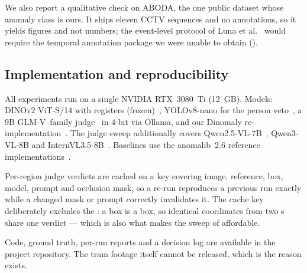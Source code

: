 We also report a qualitative check on ABODA, the one public dataset whose
anomaly class is ours. It ships eleven CCTV sequences and no annotations, so it
yields figures and not numbers; the event-level protocol of Luna et
al.~\cite{Luna_2018} would require the temporal annotation package we were
unable to obtain ().

\subsection{Implementation and reproducibility}
\label{sec:setup:repro}

All experiments run on a single NVIDIA RTX~3080~Ti (12~GB). Models: DINOv2
ViT-S/14 with registers (frozen)~\cite{Oquab_2023}, YOLOv8-nano for the person
veto~\cite{Jocher_2023_yolov8}, a 9B GLM-V--family
judge~\cite{VTeam_2025_glm45v} in 4-bit via Ollama, and our Dinomaly
re-implementation~\cite{Guo_2025}. The judge sweep additionally covers
Qwen2.5-VL-7B~\cite{Bai_2025_qwen25vl}, Qwen3-VL-8B and
InternVL3.5-8B~\cite{Wang_2025_internvl35}. Baselines use the anomalib~2.6
reference implementations~\cite{Akcay_2022}.

Per-region judge verdicts are cached on a key covering image, reference, box,
model, prompt and occlusion mask, so a re-run reproduces a previous run exactly
while a changed mask or prompt correctly invalidates it. The cache key
deliberately excludes the \proposer{}: a box is a box, so identical coordinates
from two \proposer{}s share one verdict --- which is also what makes the sweep
of  affordable.

Code, ground truth, per-run reports and a decision log are available in the
project repository. The tram footage itself cannot be released, which is the
reason  exists.

